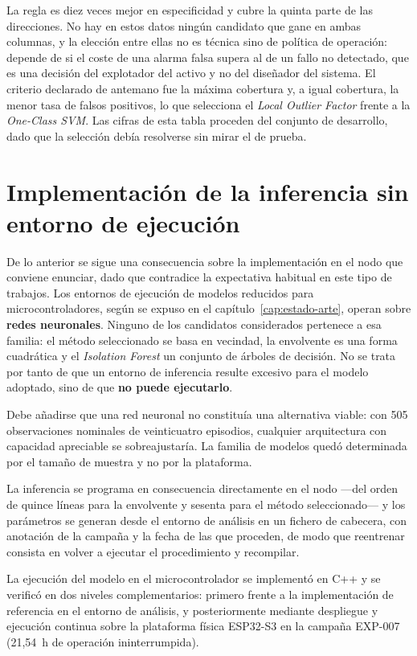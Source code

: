La regla es diez veces mejor en especificidad y cubre la quinta parte de las direcciones. No hay
en estos datos ningún candidato que gane en ambas columnas, y la elección entre ellas no es
técnica sino de política de operación: depende de si el coste de una alarma falsa supera al de un
fallo no detectado, que es una decisión del explotador del activo y no del diseñador del sistema.
El criterio declarado de antemano fue la máxima cobertura y, a igual cobertura, la menor tasa de
falsos positivos, lo que selecciona el \textit{Local Outlier Factor} frente a la
\textit{One-Class SVM}. Las cifras de esta tabla proceden del conjunto de desarrollo, dado que la
selección debía resolverse sin mirar el de prueba.
\section{Implementación de la inferencia sin entorno de ejecución}

De lo anterior se sigue una consecuencia sobre la implementación en el nodo que conviene
enunciar, dado que contradice la expectativa habitual en este tipo de trabajos. Los entornos de
ejecución de modelos reducidos para microcontroladores, según se expuso en el
capítulo~\ref{cap:estado-arte}, operan sobre \textbf{redes neuronales}. Ninguno de los
candidatos considerados pertenece a esa familia: el método seleccionado se basa en vecindad, la
envolvente es una forma cuadrática y el \textit{Isolation Forest} un conjunto de árboles de
decisión. No se trata por tanto de que un entorno de inferencia resulte excesivo para el modelo
adoptado, sino de que \textbf{no puede ejecutarlo}.

Debe añadirse que una red neuronal no constituía una alternativa viable: con 505 observaciones
nominales de veinticuatro episodios, cualquier arquitectura con capacidad apreciable se
sobreajustaría. La familia de modelos quedó determinada por el tamaño de muestra y no por la
plataforma.

La inferencia se programa en consecuencia directamente en el nodo —del orden de quince líneas
para la envolvente y sesenta para el método seleccionado— y los parámetros se generan desde el
entorno de análisis en un fichero de cabecera, con anotación de la campaña y la fecha de las que
proceden, de modo que reentrenar consista en volver a ejecutar el procedimiento y recompilar.

La ejecución del modelo en el microcontrolador se implementó en C++ y se verificó en dos
niveles complementarios: primero frente a la implementación de referencia en el entorno de
análisis, y posteriormente mediante despliegue y ejecución continua sobre la plataforma física
ESP32-S3 en la campaña EXP-007 (\mbox{21,54 h} de operación ininterrumpida).

